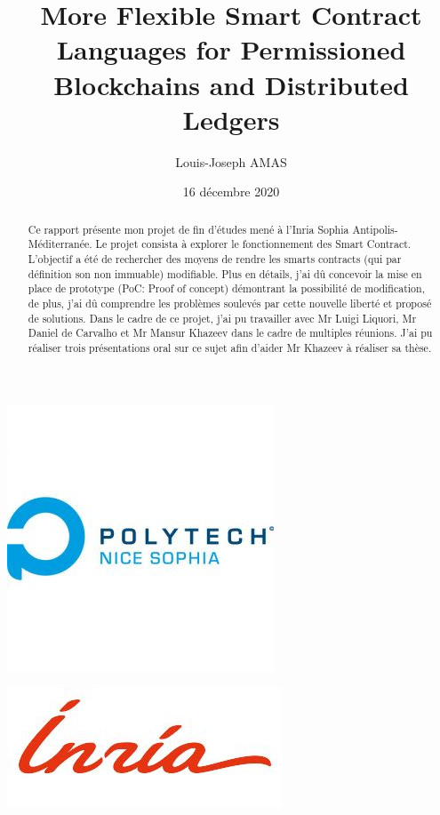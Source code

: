 \documentclass[11pt,oneside,a4paper]{article}
\begin{document}
\title{More Flexible Smart Contract Languages for Permissioned
Blockchains and Distributed Ledgers}
\author{Louis-Joseph AMAS}
\date{16 décembre 2020}
\maketitle

\begin{center}
  \includegraphics[scale=0.5]{polytech.jpg}
\end{center}

\begin{center}
  \includegraphics[scale=0.5]{inria.jpg}
\end{center}

\begin{abstract}
Ce rapport présente mon projet de fin d'études mené à l'Inria Sophia Antipolis-Méditerranée. 
Le projet consista à explorer le fonctionnement des Smart Contract. L'objectif a été de rechercher des moyens de rendre
les smarts contracts (qui par définition son non immuable) modifiable.
Plus en détails, j'ai dû concevoir la mise en place de prototype (PoC: Proof of concept) démontrant la possibilité de modification,
de plus, j'ai dû comprendre les problèmes soulevés par cette nouvelle liberté et proposé de solutions.
Dans le cadre de ce projet, j'ai pu travailler avec Mr Luigi Liquori, Mr Daniel de Carvalho et Mr Mansur Khazeev dans le cadre de multiples réunions. 
J'ai pu réaliser trois présentations oral sur ce sujet afin d'aider Mr Khazeev à réaliser sa thèse.

\end{abstract}
\newpage
\tableofcontents
\end{document}
